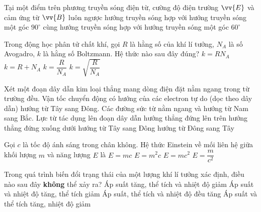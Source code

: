 	\begin{ex}%
		Tại một điểm trên phương truyền sóng điện từ, cường độ điện trường $\vv{E}$ và cảm ứng từ $\vv{B}$ luôn
		\choice
		{ngược hướng truyền sóng}
		{\True hợp với hướng truyền sóng một góc $90^\circ$}
		{cùng hướng truyền sóng}
		{hợp với hướng truyền sóng một góc $60^\circ$}
	\end{ex}

	\begin{ex}%
		Trong động học phân tử chất khí, gọi $R$ là hằng số của khí lí tưởng, $N_A$ là số Avogadro, $k$ là hằng số Boltzmann. Hệ thức nào sau đây đúng?
		\choice
		{$k=RN_A$}
		{$k=R+N_A$}
		{\True $k=\dfrac{R}{N_A}$}
		{$k=\sqrt{\dfrac{R}{N_A}}$}
	\end{ex}

	\begin{ex}%
		Xét một đoạn dây dẫn kim loại thẳng mang dòng điện đặt nằm ngang trong từ trường đều. Vận tốc chuyển động có hướng của các electron tự do (dọc theo dây dẫn) hướng từ Tây sang Đông. Các đường sức từ nằm ngang và hướng từ Nam sang Bắc. Lực từ tác dụng lên đoạn dây dẫn
		\choice
		{hướng thẳng đứng lên trên}
		{\True hướng thẳng đứng xuống dưới}
		{hướng từ Tây sang Đông}
		{hướng từ Đông sang Tây}
	\end{ex}

	\begin{ex}%
		Gọi $c$ là tốc độ ánh sáng trong chân không. Hệ thức Einstein về mối liên hệ giữa khối lượng $m$ và năng lượng $E$ là
		\choice
		{$E=mc$}
		{$E=m^2c$}
		{\True $E=mc^2$}
		{$E=\dfrac{m}{c^2}$}
	\end{ex}

	\begin{ex}%
		Trong quá trình biến đổi trạng thái của một lượng khí lí tưởng xác định, điều nào sau đây \textbf{không} thể xảy ra?
		\choice
		{Áp suất tăng, thể tích và nhiệt độ giảm}
		{Áp suất và nhiệt độ tăng, thể tích giảm}
		{Áp suất, thể tích và nhiệt độ đều tăng}
		{\True Áp suất và thể tích tăng, nhiệt độ giảm}
	\end{ex}

